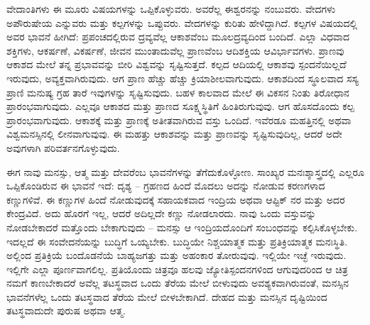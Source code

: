 ವೇದಾಂತಿಗಳು ಈ ಮೂರು ವಿಷಯಗಳನ್ನು ಒಪ್ಪಿಕೊಳ್ಳುವರು. ಅವರೆಲ್ಲ ಈಶ್ವರನನ್ನು ನಂಬುವರು. ವೇದಗಳು ಅಪೌರುಷೇಯ ಎನ್ನುವರು ಮತ್ತು ಕಲ್ಪಗಳನ್ನು ಒಪ್ಪುವರು. ವೇದಗಳನ್ನು ಕುರಿತು ಹೇಳಿದ್ದಾಗಿದೆ. ಕಲ್ಪಗಳ ವಿಷಯದಲ್ಲಿ ಅವರ ಭಾವನೆ ಹೀಗಿದೆ: ಪ್ರಪಂಚದಲ್ಲಿರುವ ದ್ರವ್ಯವೆಲ್ಲ ಆಕಾಶವೆಂಬ ಮೂಲದ್ರವ್ಯದಿಂದ ಬಂದಿದೆ. ಎಲ್ಲಾ ವಿಧವಾದ ಶಕ್ತಿಗಳು, ಆಕರ್ಷಣೆ, ವಿಕರ್ಷಣೆ, ಜೀವನ ಮುಂತಾದುವೆಲ್ಲ ಪ್ರಾಣವೆಂಬ ಆದಿಶಕ್ತಿಯ ಆವಿರ್ಭಾವಗಳು. ಪ್ರಾಣವು ಆಕಾಶದ ಮೇಲೆ ತನ್ನ ಪ್ರಭಾವವನ್ನು ಬೀರಿ ವಿಶ್ವವನ್ನು ಸೃಷ್ಟಿಸುತ್ತದೆ. ಕಲ್ಪದ ಆದಿಯಲ್ಲಿ ಆಕಾಶವು ಸ್ಪಂದನೆಯಿಲ್ಲದೆ ಇರುವುದು, ಅವ್ಯಕ್ತವಾಗಿರುವುದು. ಆಗ ಪ್ರಾಣ ಹೆಚ್ಚು ಹೆಚ್ಚು ಕ್ರಿಯಾಶೀಲವಾಗುವುದು. ಆಕಾಶದಿಂದ ಸ್ಥೂಲವಾದ ಸಸ್ಯ ಪ್ರಾಣಿ ಮನುಷ್ಯ ಗ್ರಹ ತಾರೆ ಇವುಗಳನ್ನು ಸೃಷ್ಟಿಸುವುದು. ಬಹಳ ಕಾಲವಾದ ಮೇಲೆ ಈ ವಿಕಸನ ನಿಂತು ತಿರೋಧಾನ  ಪ್ರಾರಂಭವಾಗುವುದು. ಎಲ್ಲವೂ ಆಕಾಶದ ಮತ್ತು ಪ್ರಾಣದ ಸೂಕ್ಷ್ಮಸ್ಥಿತಿಗೆ ಹಿಂತಿರುಗುವುವು. ಆಗ ಹೊಸದೊಂದು ಕಲ್ಪ ಪ್ರಾರಂಭವಾಗುವುದು. ಆಕಾಶಕ್ಕೆ ಮತ್ತು ಪ್ರಾಣಕ್ಕೆ ಅತೀತವಾಗಿರುವ ವಸ್ತು ಒಂದಿದೆ. ಇವೆರಡೂ ಮಹತ್ತಿನಲ್ಲಿ ಅಥವಾ ವಿಶ್ವಮನಸ್ಸಿನಲ್ಲಿ ಲೀನವಾಗುವುವು. ಈ ಮಹತ್ತು ಆಕಾಶವನ್ನು ಮತ್ತು ಪ್ರಾಣವನ್ನು ಸೃಷ್ಟಿಸುವುದಿಲ್ಲ, ಆದರೆ ಅದೇ ಅವುಗಳಾಗಿ ಪರಿವರ್ತನಗೊಳ್ಳುವುದು.

ಈಗ ನಾವು ಮನಸ್ಸು, ಆತ್ಮ ಮತ್ತು ದೇವರೆಂಬ ಭಾವನೆಗಳನ್ನು ತೆಗೆದುಕೊಳ್ಳೋಣ. ಸಾಂಖ್ಯರ ಮನಃಶ್ಶಾಸ್ತ್ರದಲ್ಲಿ ಎಲ್ಲರೂ ಒಪ್ಪಿಕೊಂಡಿರುವ ಈ ಭಾವನೆ ಇದೆ: ದೃಶ್ಯ – ಗ್ರಹಣದ ಹಿಂದೆ ಮೊದಲು ಅದನ್ನು ನೋಡುವ ಕರಣಗಳಾದ ಕಣ್ಣುಗಳಿವೆ. ಈ ಕಣ್ಣುಗಳ ಹಿಂದೆ ನೋಡುವುದಕ್ಕೆ ಸಹಾಯಕವಾದ ಇಂದ್ರಿಯ ಅಥವಾ ಆಪ್ಟಿಕ್ ನರ ಮತ್ತು ಅದರ ಕೇಂದ್ರವಿದೆ. ಅದು ಹೊರಗೆ ಇಲ್ಲ, ಆದರೆ ಅದಿಲ್ಲದೇ ಕಣ್ಣು ನೋಡಲಾರದು. ನಾವು ಒಂದು ವಸ್ತುವನ್ನು ನೋಡಬೇಕಾದರೆ ಮತ್ತೊಂದು ಬೇಕಾಗುವುದು – ಮನಸ್ಸು ಆ ಇಂದ್ರಿಯದೊಂದಿಗೆ ಸಂಬಂಧವನ್ನು ಕಲ್ಪಿಸಿಕೊಳ್ಳಬೇಕು. ಇದಲ್ಲದೆ ಈ ಸಂವೇದನೆಯನ್ನು  ಬುದ್ಧಿಗೆ ಒಯ್ಯಬೇಕು. ಬುದ್ಧಿಯೇ ನಿಶ್ಚಯಾತ್ಮಕ ಮತ್ತು ಪ್ರತಿಕ್ರಿಯಾತ್ಮಕ ಮನಃಸ್ಥಿತಿ. ಅಲ್ಲಿಂದ ಪ್ರತಿಕ್ರಿಯೆ ಬಂದೊಡನೆಯೆ ಬಾಹ್ಯಜಗತ್ತು ಮತ್ತು ಅಹಂಕಾರ ತೋರುವುವು. ಇಲ್ಲಿಯೇ ಇಚ್ಛೆ ಇರುವುದು. ಇಲ್ಲಿಗೇ ಎಲ್ಲಾ ಪೂರ್ಣವಾಗಲಿಲ್ಲ. ಪ್ರತಿಯೊಂದು ಚಿತ್ರವೂ ಹಲವು ಜ್ಯೋತಿಸ್ಪಂದನಗಳಿಂದ ಆಗುವುದರಿಂದ ಆ ಚಿತ್ರ ನಮಗೆ ಕಾಣಬೇಕಾದರೆ ಅವೆಲ್ಲ ತಟಸ್ಥವಾದ ಒಂದು ತೆರೆಯ ಮೇಲೆ ಬೀಳುವುದು ಅವಶ್ಯಕವಾಗಿರುವಂತೆ, ಮನಸ್ಸಿನ ಭಾವನೆಗಳೆಲ್ಲ ಒಂದು ತಟಸ್ಥವಾದ ತೆರೆಯ ಮೇಲೆ ಬೀಳಬೇಕಾಗಿದೆ. ದೇಹದ ಮತ್ತು ಮನಸ್ಸಿನ ದೃಷ್ಟಿಯಿಂದ ತಟಸ್ಥವಾದುದೇ ಪುರುಷ ಅಥವಾ ಆತ್ಮ.

